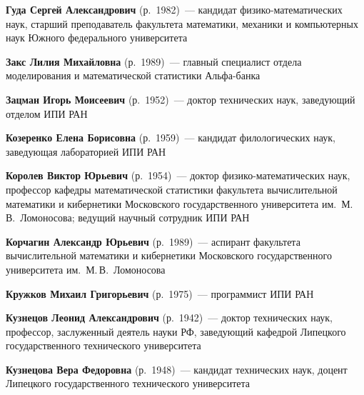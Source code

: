 \begin{multicols}{2}
\noindent
\textbf{Гуда Сергей Александрович} (р.\ 1982)~---  кандидат фи\-зи\-ко-ма\-те\-ма\-ти\-че\-ских 
наук, старший преподаватель факультета математики, механики и компьютерных наук Южного 
федерального университета

\vspace*{8pt}

\noindent
\textbf{Закс Лилия Михайловна} (р.\ 1989)~--- главный специалист отдела 
моделирования и математической статистики Аль\-фа-банка

\vspace*{8pt}

\noindent
\textbf{Зацман Игорь Моисеевич} (р.\ 1952)~--- доктор технических наук, заведующий отделом 
ИПИ РАН

\vspace*{8pt}

\noindent
\textbf{Козеренко Елена Борисовна} (р.\ 1959)~--- кандидат филологических наук, 
заведующая лабораторией ИПИ РАН

\vspace*{8pt}

\noindent
\textbf{Королев Виктор Юрьевич} (р.\ 1954)~--- доктор фи\-зи\-ко-ма\-те\-ма\-ти\-че\-ских наук, 
профессор кафедры математической статистики факультета вычислительной математики и кибернетики 
Московского государ\-ст\-вен\-но\-го университета им.\ М.\,В.~Ломоносова; 
ведущий научный сотрудник ИПИ РАН

\vspace*{8pt}

\noindent
\textbf{Корчагин Александр Юрьевич} (р.\ 1989)~--- аспирант факультета
вычислительной математики и кибернетики Московского государственного университета им.\ М.\,В.~Ломоносова 

\vspace*{6pt}

\noindent
\textbf{Кружков Михаил Григорьевич} (р.\ 1975)~--- программист ИПИ РАН

\vspace*{6pt}

\noindent
\textbf{Кузнецов Леонид Александрович} (р.\ 1942)~--- доктор технических наук, 
профессор, заслуженный деятель науки РФ, заведующий кафедрой Липецкого 
государственного технического университета

\vspace*{6pt}

\noindent
\textbf{Кузнецова  Вера  Федоровна} (р.\ 1948)~--- кандидат технических наук, 
доцент Липецкого государственного технического университета


\end{multicols}

